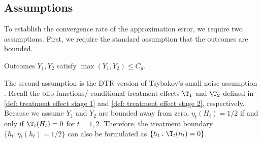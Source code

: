 \documentclass[preprint] {imsart}
\begin{document}
\subsection{Assumptions}
\label{sec: small noise}
 
To establish the  convergence rate   of the approximation error, we require two assumptions.
First, we require the standard assumption that the outcomes are bounded.
\begin{assumption}\label{assump: bound on Y}
Outcomes $Y_1,Y_2$ satisfy $\max (Y_1,Y_2)\leq C_y$.
\end{assumption}
The second assumption is the DTR version of Tsybakov's small noise assumption \citep{tsybakov2004, audibert2007}. Recall the blip functions/ conditional treatment effects $\T_1$ and $\T_2$ defined in \eqref{def: treatment effect stage 1} and \eqref{def: treatment effect stage 2}, respectively. %
Because we assume $Y_1$ and $Y_2$ are bounded away from zero, $\eta_t(H_t)=1/2$ if and only if $\T_t(H_t)=0$ for $t=1,2$. Therefore, the treatment boundary $\{h_t:\eta_t(h_t)=1/2\}$ can also be formulated as  $\{h_t:\T_t(h_t)=0\}$. 
\end{document}
